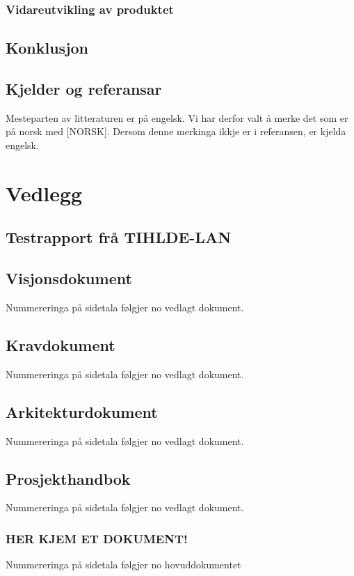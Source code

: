 \documentclass[nynorsk,12pt,a4paper,oneside]{book}
\begin{document}
\section{Vidareutvikling av produktet}
\chapter{Konklusjon}
\chapter{Kjelder og referansar}
Mesteparten av litteraturen er på engelsk. Vi har derfor valt å merke det som er på norsk med [NORSK]. Dersom denne merkinga ikkje er i referansen, er kjelda engelsk. 


{}

\part{Vedlegg}
\appendix 
\chapter{Testrapport frå TIHLDE-LAN}
\chapter{Visjonsdokument}
	Nummereringa på sidetala følgjer no vedlagt dokument.
	
	
\chapter{Kravdokument}
	Nummereringa på sidetala følgjer no vedlagt dokument.
	
\chapter{Arkitekturdokument}
	Nummereringa på sidetala følgjer no vedlagt dokument.
  	
\chapter{Prosjekthandbok}
	Nummereringa på sidetala følgjer no vedlagt dokument.
%	
	\section*{HER KJEM ET DOKUMENT!}
	Nummereringa på sidetala følgjer no hovuddokumentet
\end{document}
